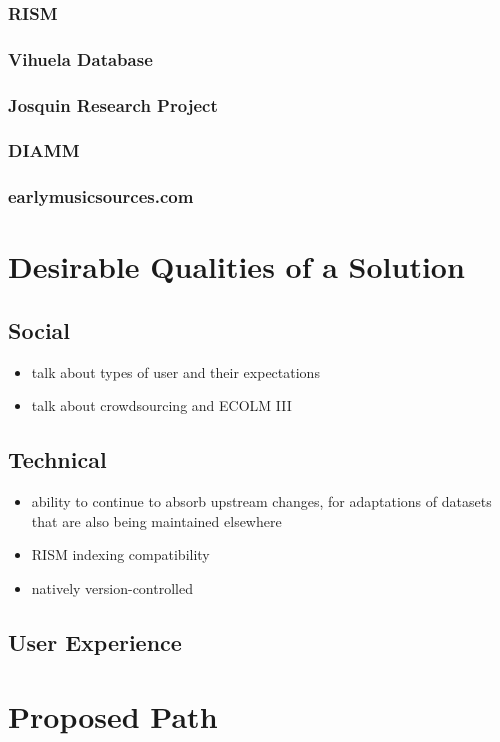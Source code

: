 \documentclass[twocolumn,10pt]{paper}
\begin{document}
\begin{sloppypar}
  \subsubsection{RISM}
  \subsubsection{Vihuela Database}
  \subsubsection{Josquin Research Project}
  \subsubsection{DIAMM}
  \subsubsection{earlymusicsources.com}

  \section{Desirable Qualities of a Solution}
  \subsection{Social}

  \begin{itemize}
  \item talk about types of user and their expectations
  \item talk about crowdsourcing and ECOLM III
  \end{itemize}

  
  \subsection{Technical}

  \begin{itemize}
  \item ability to continue to absorb upstream changes, for
    adaptations of datasets that are also being maintained elsewhere
  \item RISM indexing compatibility
  \item natively version-controlled
  \end{itemize}

  
  \subsection{User Experience}

  \section{Proposed Path}

  
\end{sloppypar}
\end{document}
